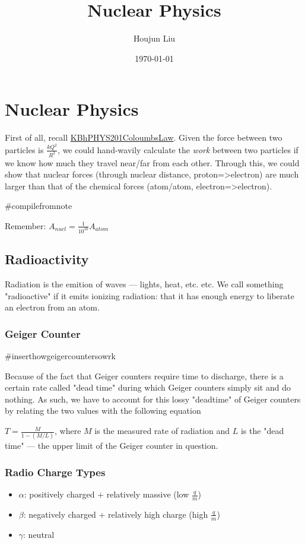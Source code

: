 \documentclass[letterpaper]{article}
\author{Houjun Liu}
\date{\today}
\title{Nuclear Physics}
\renewcommand\maketitle{}
\begin{document}
\maketitle


\section{Nuclear Physics}
\label{sec:org4ff7d45}
First of all, recall
\href{KBhPHYS201ColoumbsLaw.org}{KBhPHYS201ColoumbsLaw}. Given the
force between two particles is \(\frac{kQ^2}{R^2}\), we could
hand-wavily calculate the \emph{work} between two particles if we know how
much they travel near/far from each other. Through this, we could show
that nuclear forces (through nuclear distance, proton=>electron) are
much larger than that of the chemical forces (atom/atom,
electron=>electron).

\#compilefromnote

Remember: \(A_{nucl} = \frac{1}{10^{10}} A_{atom}\)

\subsection{Radioactivity}
\label{sec:orgcf89909}
Radiation is the emition of waves --- lights, heat, etc. etc. We call
something "radioactive" if it emits ionizing radiation: that it has
enough energy to liberate an electron from an atom.

\subsubsection{Geiger Counter}
\label{sec:orgfcdf3a3}
\#inserthowgeigercountersowrk

Because of the fact that Geiger counters require time to discharge,
there is a certain rate called "dead time" during which Geiger counters
simply sit and do nothing. As such, we have to account for this lossy
"deadtime" of Geiger counters by relating the two values with the
following equation

\(T = \frac{M}{1-(M/L)}\), where \(M\) is the measured rate of radiation
and \(L\) is the "dead time" --- the upper limit of the Geiger counter
in question.

\subsubsection{Radio Charge Types}
\label{sec:org48b3cbc}
\begin{itemize}
\item \(\alpha\): positively charged + relatively massive (low
\(\frac{q}{m}\))
\item \(\beta\): negatively charged + relatively high charge (high
\(\frac{q}{m}\))
\item \(\gamma\): neutral
\end{itemize}
\end{document}
